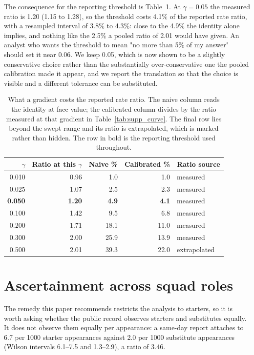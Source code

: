 \documentclass[11pt]{article}
\begin{document}
The consequence for the reporting threshold is Table~\ref{tab:supp_threshold}. At $\gamma=0.05$ the measured ratio is 1.20 (1.15 to 1.28), so the threshold costs 4.1\% of the reported rate ratio, with a resampled interval of 3.8\% to 4.3\%: close to the 4.9\% the identity alone implies, and nothing like the 2.5\% a pooled ratio of 2.01 would have given. An analyst who wants the threshold to mean "no more than 5\% of my answer" should set it near 0.06. We keep 0.05, which is now shown to be a slightly conservative choice rather than the substantially over-conservative one the pooled calibration made it appear, and we report the translation so that the choice is visible and a different tolerance can be substituted.

\begin{table}[h]
\centering
\caption{What a gradient costs the reported rate ratio. The naive column reads the identity at face value; the calibrated column divides by the ratio measured at that gradient in Table~\ref{tab:supp_curve}. The final row lies beyond the swept range and its ratio is extrapolated, which is marked rather than hidden. The row in bold is the reporting threshold used throughout.}
\label{tab:supp_threshold}
\footnotesize
\setlength{\tabcolsep}{5pt}
\begin{tabular}{rrrrl}
\toprule
$\gamma$ & Ratio at this $\gamma$ & Naive \% & Calibrated \% & Ratio source\\
\midrule
0.010 & 0.96 & 1.0 & 1.0 & measured\\
0.025 & 1.07 & 2.5 & 2.3 & measured\\
\textbf{0.050} & \textbf{1.20} & \textbf{4.9} & \textbf{4.1} & measured\\
0.100 & 1.42 & 9.5 & 6.8 & measured\\
0.200 & 1.71 & 18.1 & 11.0 & measured\\
0.300 & 2.00 & 25.9 & 13.9 & measured\\
0.500 & 2.01 & 39.3 & 22.0 & extrapolated\\
\bottomrule
\end{tabular}
\end{table}

\section{Ascertainment across squad roles}

The remedy this paper recommends restricts the analysis to starters, so it is worth asking whether the public record observes starters and substitutes equally. It does not observe them equally per appearance: a same-day report attaches to 6.7 per 1000 starter appearances against 2.0 per 1000 substitute appearances (Wilson intervals 6.1--7.5 and 1.3--2.9), a ratio of 3.46.
\end{document}
